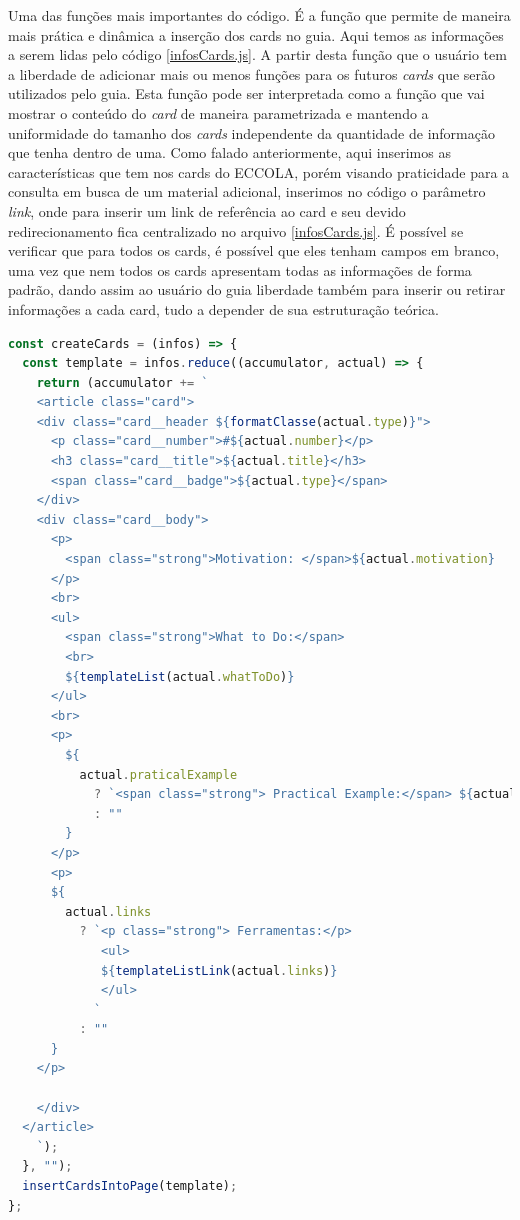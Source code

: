 Uma das funções mais importantes do código. É a função que permite de maneira mais prática e dinâmica a inserção dos cards no guia. Aqui temos as informações a serem lidas pelo código \ref{infosCards.js}. A partir desta função que o usuário tem a liberdade de adicionar mais ou menos funções para os futuros \textit{cards} que serão utilizados pelo guia. Esta função pode ser interpretada como a função que vai mostrar o conteúdo do \textit{card} de maneira parametrizada e mantendo a uniformidade do tamanho dos \textit{cards} independente da quantidade de informação que tenha dentro de uma. Como falado anteriormente, aqui inserimos as características que tem nos cards do ECCOLA, porém visando praticidade para a consulta em busca de um material adicional, inserimos no código o parâmetro \textit{link}, onde para inserir um link de referência ao card e seu devido redirecionamento fica centralizado no arquivo \ref{infosCards.js}. É possível se verificar que para todos os cards, é possível que eles tenham campos em branco, uma vez que nem todos os cards apresentam todas as informações de forma padrão, dando assim ao usuário do guia liberdade também para inserir ou retirar informações a cada card, tudo a depender de sua estruturação teórica.
\begin{lstlisting}[language=JavaScript, caption=Função para a criação do conteúdo de cada um dos cards ]
const createCards = (infos) => {
  const template = infos.reduce((accumulator, actual) => {
    return (accumulator += `
    <article class="card">
    <div class="card__header ${formatClasse(actual.type)}">
      <p class="card__number">#${actual.number}</p>
      <h3 class="card__title">${actual.title}</h3>
      <span class="card__badge">${actual.type}</span>
    </div>
    <div class="card__body">
      <p>
        <span class="strong">Motivation: </span>${actual.motivation}
      </p>
      <br>
      <ul>
        <span class="strong">What to Do:</span> 
        <br>
        ${templateList(actual.whatToDo)}
      </ul>
      <br>
      <p>
        ${
          actual.praticalExample
            ? `<span class="strong"> Practical Example:</span> ${actual.praticalExample} `
            : ""
        }
      </p>
      <p>
      ${
        actual.links
          ? `<p class="strong"> Ferramentas:</p> 
             <ul>
             ${templateListLink(actual.links)}
             </ul>
            `
          : ""
      }
    </p>

    </div>
  </article>
    `);
  }, "");
  insertCardsIntoPage(template);
};
\end{lstlisting}

